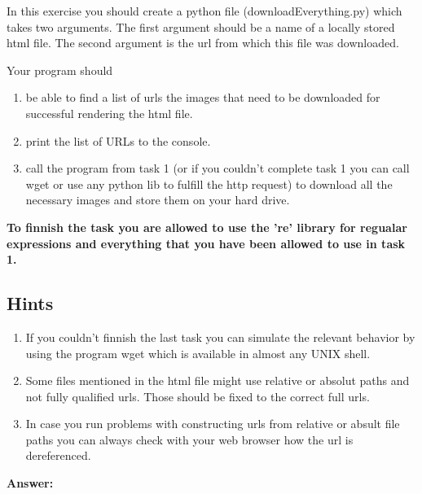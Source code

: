 \documentclass{WeSTassignment}
\begin{document}
In this exercise you should create a python file (downloadEverything.py) which takes two arguments. The first argument should be a name of a locally stored html file. The second argument is the url from which this file was downloaded.

Your program should 
\begin{enumerate}
\item be able to find a list of urls the images that need to be downloaded for successful rendering the html file.
\item print the list of URLs to the console.
\item call the program from task 1 (or if you couldn't complete task 1 you can call wget or use any python lib to fulfill the http request) to download all the necessary images and store them on your hard drive.
\end{enumerate}

\textbf{To finnish the task you are allowed to use the 're' library for regualar expressions and everything that you have been allowed to use in task 1.}

\subsection{Hints}
\begin{enumerate}
\item If you couldn't finnish the last task you can simulate the relevant behavior by using the program wget which is available in almost any UNIX shell. 
\item Some files mentioned in the html file might use relative or absolut paths and not fully qualified urls. Those should be fixed to the correct full urls. 
\item In case you run problems with constructing urls from relative or absult file paths you can always check with your web browser how the url is dereferenced. \\
\end{enumerate}


\textbf{Answer: } \\
\end{document}
